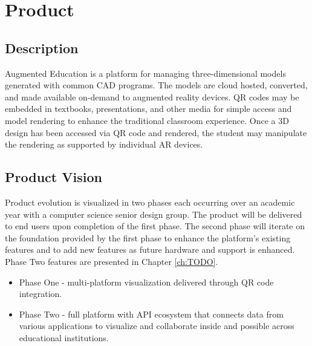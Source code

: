 \section{Product}

\subsection{Description}
Augmented Education is a platform for managing three-dimensional models generated with common CAD programs.
The models are cloud hosted, converted, and made available on-demand to augmented reality devices.
QR codes may be embedded in textbooks, presentations, and other media for simple access and model rendering to enhance the traditional classroom experience. 
Once a 3D design has been accessed via QR code and rendered, the student may manipulate the rendering as supported by individual AR devices. 

\subsection{Product Vision}
Product evolution is visualized in two phases each occurring over an academic year with a computer science senior design group. The product will be delivered to end users upon completion of the first phase. The second phase will iterate on the foundation provided by the first phase to enhance the platform's existing features and to add new features as future hardware and support is enhanced. Phase Two features are presented in Chapter \ref{ch:TODO}.

\begin{itemize}
\item Phase One - multi-platform visualization delivered through QR code integration.
\item Phase Two - full platform with API ecosystem that connects data from various applications to visualize and collaborate inside and possible across educational institutions. 
\end{itemize}


